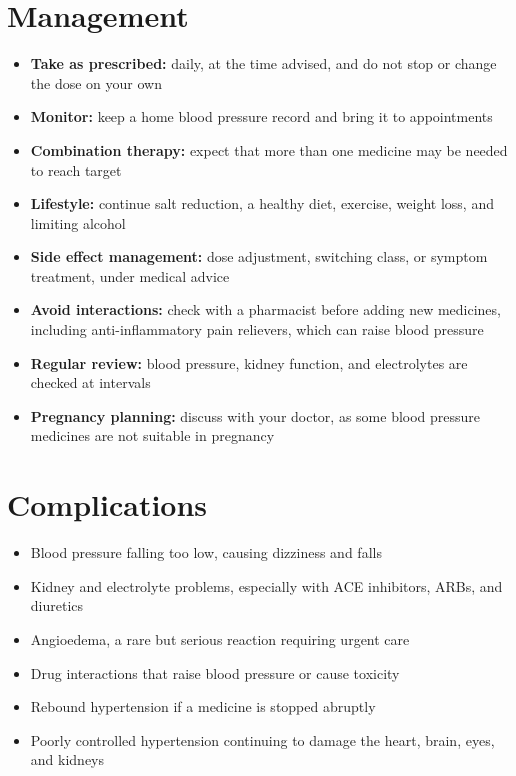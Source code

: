 \section*{Management}
\begin{itemize}
    \item \textbf{Take as prescribed:} daily, at the time advised, and do not stop or change the dose on your own
    \item \textbf{Monitor:} keep a home blood pressure record and bring it to appointments
    \item \textbf{Combination therapy:} expect that more than one medicine may be needed to reach target
    \item \textbf{Lifestyle:} continue salt reduction, a healthy diet, exercise, weight loss, and limiting alcohol
    \item \textbf{Side effect management:} dose adjustment, switching class, or symptom treatment, under medical advice
    \item \textbf{Avoid interactions:} check with a pharmacist before adding new medicines, including anti-inflammatory pain relievers, which can raise blood pressure
    \item \textbf{Regular review:} blood pressure, kidney function, and electrolytes are checked at intervals
    \item \textbf{Pregnancy planning:} discuss with your doctor, as some blood pressure medicines are not suitable in pregnancy
\end{itemize}

\section*{Complications}
\begin{itemize}
    \item Blood pressure falling too low, causing dizziness and falls
    \item Kidney and electrolyte problems, especially with ACE inhibitors, ARBs, and diuretics
    \item Angioedema, a rare but serious reaction requiring urgent care
    \item Drug interactions that raise blood pressure or cause toxicity
    \item Rebound hypertension if a medicine is stopped abruptly
    \item Poorly controlled hypertension continuing to damage the heart, brain, eyes, and kidneys
\end{itemize}


